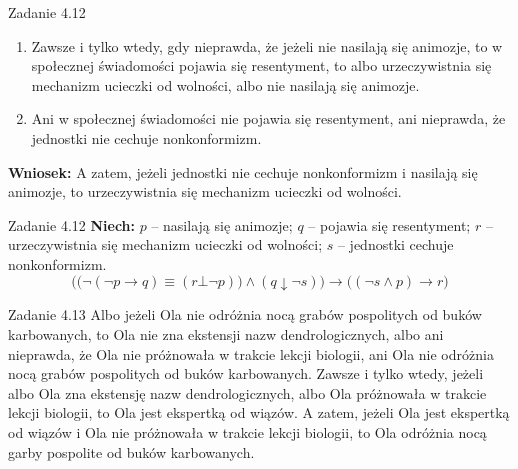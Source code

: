 \documentclass[12pt]{beamer}
\begin{document}
\begin{frame}{Zadanie 4.12}
\footnotesize
\begin{enumerate}
    \item[P1.] Zawsze i tylko wtedy, gdy nieprawda, że jeżeli nie nasilają się animozje, to w społecznej świadomości pojawia się resentyment, to albo urzeczywistnia się mechanizm ucieczki od wolności, albo nie nasilają się animozje.
    \item[P2.] Ani w społecznej świadomości nie pojawia się resentyment, ani nieprawda, że jednostki nie cechuje nonkonformizm.
\end{enumerate}
\vspace{4pt}
\textbf{Wniosek:} A zatem, jeżeli jednostki nie cechuje nonkonformizm i nasilają się animozje, to urzeczywistnia się mechanizm ucieczki od wolności.
\end{frame}

\begin{frame}{Zadanie 4.12}
\small
\textbf{Niech:} $p$ -- nasilają się animozje; $q$ -- pojawia się resentyment; $r$ -- urzeczywistnia się mechanizm ucieczki od wolności; $s$ -- jednostki cechuje nonkonformizm.
\vspace{10pt}
\[ \Big(\big(\neg(\neg p \rightarrow q) \equiv (r \bot \neg p)\big) \wedge (q \downarrow \neg s)\Big) \rightarrow \big((\neg s \wedge p) \rightarrow r\big) \]
\end{frame}

\begin{frame}{Zadanie 4.13}
\footnotesize
Albo jeżeli Ola nie odróżnia nocą grabów pospolitych od buków karbowanych, to Ola nie zna ekstensji nazw dendrologicznych, albo ani nieprawda, że Ola nie próżnowała w trakcie lekcji biologii, ani Ola nie odróżnia nocą grabów pospolitych od buków karbowanych. Zawsze i tylko wtedy, jeżeli albo Ola zna ekstensję nazw dendrologicznych, albo Ola próżnowała w trakcie lekcji biologii, to Ola jest ekspertką od wiązów. A zatem, jeżeli Ola jest ekspertką od wiązów i Ola nie próżnowała w trakcie lekcji biologii, to Ola odróżnia nocą garby pospolite od buków karbowanych.
\end{frame}
\end{document}
